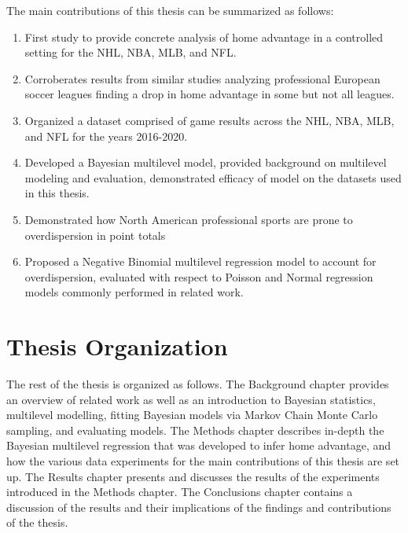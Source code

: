 The main contributions of this thesis can be summarized as follows:
\begin{enumerate}
	\item First study to provide concrete analysis of home advantage in a controlled setting for the NHL, NBA, MLB, and NFL.
	\item Corroberates results from similar studies analyzing professional European soccer leagues finding a drop in home advantage in some but not all leagues.
	\item Organized a dataset comprised of game results across the NHL, NBA, MLB, and NFL for the years 2016-2020.
	\item Developed a Bayesian multilevel model, provided background on multilevel modeling and evaluation, demonstrated efficacy of model on the datasets used in this thesis.
	\item Demonstrated how North American professional sports are prone to overdispersion in point totals
	\item Proposed a Negative Binomial multilevel regression model to account for overdispersion, evaluated with respect to Poisson and Normal regression models commonly performed in related work.
\end{enumerate}

\section{Thesis Organization}

The rest of the thesis is organized as follows. The Background chapter provides an overview of related work as well as an introduction to Bayesian statistics, multilevel modelling, fitting Bayesian models via Markov Chain Monte Carlo sampling, and evaluating models. The Methods chapter describes in-depth the Bayesian multilevel regression that was developed to infer home advantage, and how the various data experiments for the main contributions of this thesis are set up. The Results chapter presents and discusses the results of the experiments introduced in the Methods chapter. The Conclusions chapter contains a discussion of the results and their implications of the findings and contributions of the thesis.
